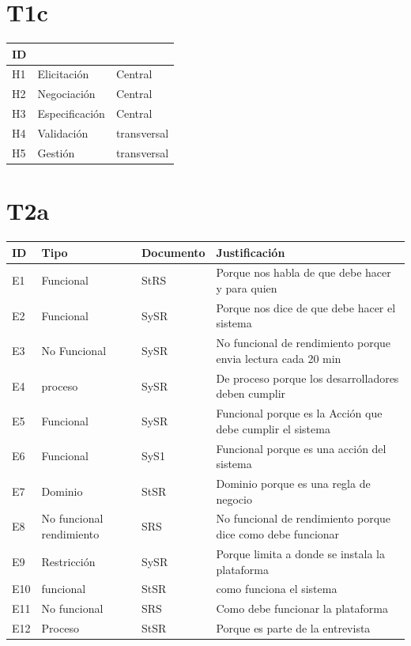\documentclass[11pt,a4paper]{article}
\begin{document}
\newpage

\section*{T1c}

\begin{tabular}{|p{1cm}|p{5cm}|p{4cm}|}
\hline
ID & & \\
\hline
H1 & Elicitación & Central \\
\hline
H2 & Negociación & Central \\
\hline
H3 & Especificación & Central \\
\hline
H4 & Validación & transversal \\
\hline
H5 & Gestión & transversal \\
\hline
\end{tabular}

\section*{T2a}

\begin{longtable}{|p{0.8cm}|p{2.5cm}|p{1.9cm}|p{8.3cm}|}
\hline
ID & Tipo & Documento & Justificación \\
\hline
E1 & Funcional & StRS &
Porque nos habla de que debe hacer y para quien \\
\hline
E2 & Funcional & SySR &
Porque nos dice de que debe hacer el sistema \\
\hline
E3 & No Funcional & SySR &
No funcional de rendimiento porque envia lectura cada 20 min \\
\hline
E4 & proceso & SySR &
De proceso porque los desarrolladores deben cumplir \\
\hline
E5 & Funcional & SySR &
Funcional porque es la Acción que debe cumplir el sistema \\
\hline
E6 & Funcional & SyS1 &
Funcional porque es una acción del sistema \\
\hline
E7 & Dominio & StSR &
Dominio porque es una regla de negocio \\
\hline
E8 & No funcional rendimiento & SRS &
No funcional de rendimiento porque dice como debe funcionar \\
\hline
E9 & Restricción & SySR &
Porque limita a donde se instala la plataforma \\
\hline
E10 & funcional & StSR &
como funciona el sistema \\
\hline
E11 & No funcional & SRS &
Como debe funcionar la plataforma \\
\hline
E12 & Proceso & StSR &
Porque es parte de la entrevista \\
\hline
\end{longtable}
\end{document}
